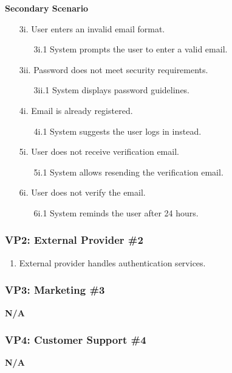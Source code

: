 \documentclass[]{article}
\begin{document}
\begin{enumerate}[{\bf BE1.}]
	\textbf{Secondary Scenario}
	\begin{enumerate}
		\item[3i.] User enters an invalid email format.
		\begin{enumerate}
			\item[3i.1] System prompts the user to enter a valid email.
		\end{enumerate}
		\item[3ii.] Password does not meet security requirements.
		\begin{enumerate}
			\item[3ii.1] System displays password guidelines.
		\end{enumerate}
		\item[4i.] Email is already registered.
		\begin{enumerate}
			\item[4i.1] System suggests the user logs in instead.
		\end{enumerate}
		\item[5i.] User does not receive verification email.
		\begin{enumerate}
			\item[5i.1] System allows resending the verification email.
		\end{enumerate}
		\item[6i.] User does not verify the email.
		\begin{enumerate}
			\item[6i.1] System reminds the user after 24 hours.
		\end{enumerate}
	\end{enumerate}

	\subsubsection*{VP2: External Provider \#2}
	\begin{enumerate}
		\item External provider handles authentication services.
	\end{enumerate}

	\subsubsection*{VP3: Marketing \#3}
	\textbf{N/A}

	\subsubsection*{VP4: Customer Support \#4}
	\textbf{N/A}  


\end{enumerate}
\end{document}
